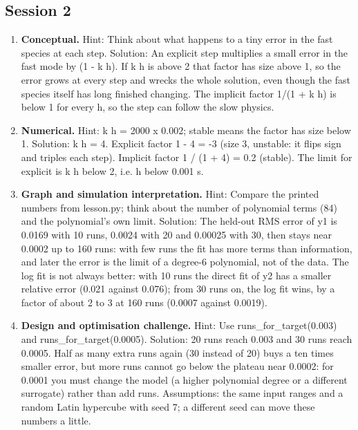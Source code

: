 \documentclass[11pt,a4paper]{article}
\begin{document}
\subsection*{Session 2}
\begin{enumerate}[nosep]
\item \textbf{Conceptual.} Hint: Think about what happens to a tiny error in the fast species at each step. Solution: An explicit step multiplies a small error in the fast mode by (1 - k h). If k h is above 2 that factor has size above 1, so the error grows at every step and wrecks the whole solution, even though the fast species itself has long finished changing. The implicit factor 1/(1 + k h) is below 1 for every h, so the step can follow the slow physics.
\item \textbf{Numerical.} Hint: k h = 2000 x 0.002; stable means the factor has size below 1. Solution: k h = 4. Explicit factor 1 - 4 = -3 (size 3, unstable: it flips sign and triples each step). Implicit factor 1 / (1 + 4) = 0.2 (stable). The limit for explicit is k h below 2, i.e. h below 0.001 s.
\item \textbf{Graph and simulation interpretation.} Hint: Compare the printed numbers from lesson.py; think about the number of polynomial terms (84) and the polynomial's own limit. Solution: The held-out RMS error of y1 is 0.0169 with 10 runs, 0.0024 with 20 and 0.00025 with 30, then stays near 0.0002 up to 160 runs: with few runs the fit has more terms than information, and later the error is the limit of a degree-6 polynomial, not of the data. The log fit is not always better: with 10 runs the direct fit of y2 has a smaller relative error (0.021 against 0.076); from 30 runs on, the log fit wins, by a factor of about 2 to 3 at 160 runs (0.0007 against 0.0019).
\item \textbf{Design and optimisation challenge.} Hint: Use runs\_for\_target(0.003) and runs\_for\_target(0.0005). Solution: 20 runs reach 0.003 and 30 runs reach 0.0005. Half as many extra runs again (30 instead of 20) buys a ten times smaller error, but more runs cannot go below the plateau near 0.0002: for 0.0001 you must change the model (a higher polynomial degree or a different surrogate) rather than add runs. Assumptions: the same input ranges and a random Latin hypercube with seed 7; a different seed can move these numbers a little.
\end{enumerate}
\end{document}
